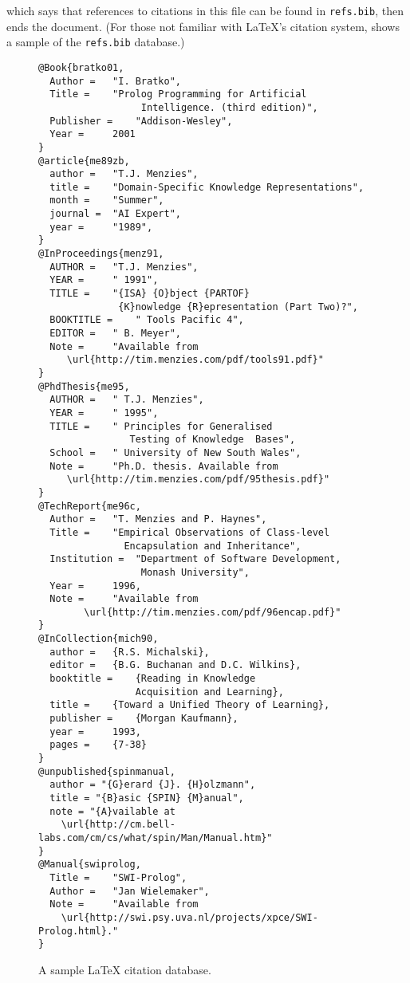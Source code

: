 which says that references to citations in this file can be found in {\tt refs.bib}, then
ends the document.
(For those not familiar with {\LaTeX}'s citation system,  shows a sample
of the {\tt refs.bib} database.)
\begin{figure}
{\scriptsize \begin{verbatim}
@Book{bratko01,
  Author =   "I. Bratko",
  Title =    "Prolog Programming for Artificial
                  Intelligence. (third edition)",
  Publisher =    "Addison-Wesley",
  Year =     2001
}
@article{me89zb,
  author =   "T.J. Menzies",
  title =    "Domain-Specific Knowledge Representations",
  month =    "Summer",
  journal =  "AI Expert",
  year =     "1989",
}
@InProceedings{menz91,
  AUTHOR =   "T.J. Menzies",
  YEAR =     " 1991",
  TITLE =    "{ISA} {O}bject {PARTOF}
              {K}nowledge {R}epresentation (Part Two)?",
  BOOKTITLE =    " Tools Pacific 4",
  EDITOR =   " B. Meyer",
  Note =     "Available from
     \url{http://tim.menzies.com/pdf/tools91.pdf}"
}
@PhdThesis{me95,
  AUTHOR =   " T.J. Menzies",
  YEAR =     " 1995",
  TITLE =    " Principles for Generalised
                Testing of Knowledge  Bases",
  School =   " University of New South Wales",
  Note =     "Ph.D. thesis. Available from
     \url{http://tim.menzies.com/pdf/95thesis.pdf}"
}
@TechReport{me96c,
  Author =   "T. Menzies and P. Haynes",
  Title =    "Empirical Observations of Class-level
               Encapsulation and Inheritance",
  Institution =  "Department of Software Development,
                  Monash University",
  Year =     1996,
  Note =     "Available from
        \url{http://tim.menzies.com/pdf/96encap.pdf}"
}
@InCollection{mich90,
  author =   {R.S. Michalski},
  editor =   {B.G. Buchanan and D.C. Wilkins},
  booktitle =    {Reading in Knowledge
                 Acquisition and Learning},
  title =    {Toward a Unified Theory of Learning},
  publisher =    {Morgan Kaufmann},
  year =     1993,
  pages =    {7-38}
}
@unpublished{spinmanual,
  author = "{G}erard {J}. {H}olzmann",
  title = "{B}asic {SPIN} {M}anual",
  note = "{A}vailable at
    \url{http://cm.bell-labs.com/cm/cs/what/spin/Man/Manual.htm}"
}
@Manual{swiprolog,
  Title =    "SWI-Prolog",
  Author =   "Jan Wielemaker",
  Note =     "Available from
    \url{http://swi.psy.uva.nl/projects/xpce/SWI-Prolog.html}."
}
\end{verbatim}}
\caption{A sample {\LaTeX} citation database.}
\end{figure}

